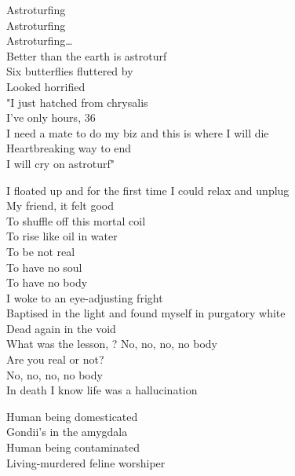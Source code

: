 Astroturfing\\
Astroturfing\\
Astroturfing…\\
Better than the earth is astroturf\\

Six butterflies fluttered by\\
Looked horrified\\
"I just hatched from chrysalis\\
I've only hours, 36\\
I need a mate to do my biz and this is where I will die\\
Heartbreaking way to end\\
I will cry on astroturf"\\




I floated up and for the first time I could relax and unplug\\
My friend, it felt good\\

To shuffle off this mortal coil\\
To rise like oil in water\\

To be not real\\
To have no soul\\
To have no body\\

I woke to an eye-adjusting fright\\
Baptised in the light and found myself in purgatory white\\
Dead again in the void\\

What was the lesson, ?
No, no, no, no body\\
Are you real or not?\\
No, no, no, no body\\

In death I know life was a hallucination\\




Human being domesticated\\
Gondii's in the amygdala\\
Human being contaminated\\
Living-murdered feline worshiper\\

